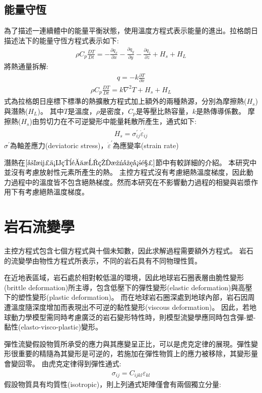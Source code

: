 \subsection{能量守恆}
為了描述一連續體中的能量平衡狀態，使用溫度方程式表示能量的進出。拉格朗日描述法下的能量守恆方程式表示如下:
\begin{align}
\rho C_p \frac{DT}{Dt} = -\frac{\partial q_x}{\partial x}-\frac{\partial q_y}{\partial y}-\frac{\partial q_z}{\partial z}+H_s+H_L
\end{align}
將熱通量拆解:
\begin{align}
q=-k\frac{\partial T}{\partial x}
\end{align}
\begin{align}
\rho C_p \frac{DT}{Dt} = k\nabla^2T+H_s+H_L
\end{align}
式為拉格朗日座標下標準的熱擴散方程式加上額外的兩種熱源，分別為摩擦熱($H_s$)與潛熱($H_L$)。
其中$T$是溫度，$\rho$是密度，$C_p$是等壓比熱容量，$k$是熱傳導係數。
摩擦熱($H_s$)由剪切力在不可逆變形中能量耗散所產生，通式如下:
\begin{align}
    H_s = \sigma^{'}_{ij}\dot\varepsilon^{'}_{ij}
\end{align}
$\sigma^{'}$為軸差應力(deviatoric stress)，$\dot\varepsilon^{'}$為應變率(strain rate)

潛熱在$\ref{岩漿作用造成的溫度影響}$節中有較詳細的介紹。
本研究中並沒有考慮放射性元素所產生的熱。
主控方程式沒有考慮絕熱溫度梯度，因此動力過程中的溫度皆不包含絕熱梯度。然而本研究在不影響動力過程的相變與岩漿作用下有考慮絕熱溫度梯度。

\section{岩石流變學}
主控方程式包含七個方程式與十個未知數，因此求解過程需要額外方程式。
岩石的流變學由物性方程式所表示，不同的岩石具有不同物理性質。

在近地表區域，岩石處於相對較低溫的環境，因此地球岩石圈表層由脆性變形(brittle deformation)所主導，包含低壓下的彈性變形(elastic deformation)與高壓下的塑性變形(plastic deformation)。
而在地球岩石圈深處到地球內部，岩石因周遭溫度隨深度增加而表現出不可逆的黏性變形(viscous deformation)。
因此，若地球動力學模型需同時考慮廣泛的岩石變形特性時，則模型流變學應同時包含彈-塑-黏性(elasto-visco-plastic)變形。

彈性流變假設物質所承受的應力與其應變呈正比，可以是虎克定律的展現。彈性變形很重要的精隨為其變形是可逆的，若施加在彈性物質上的應力被移除，其變形量會變回零。
由虎克定律得到彈性通式:
\begin{align}
\sigma_{ij}=C_{ijkl} \varepsilon_{kl}
\end{align}
假設物質具有均質性(isotropic)，則上列通式矩陣僅會有兩個獨立分量:

